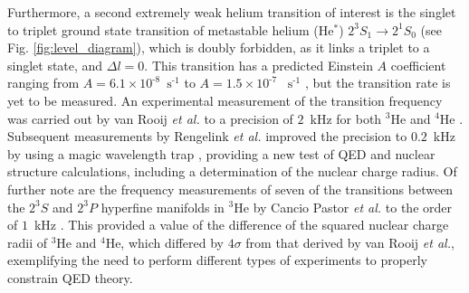 \documentclass[%
 reprint,
 amsmath,amssymb,
 aps,
 prl,
]{revtex4-2}
\newcommand{\UpperState}{3^{3\!}S_1}%
\newcommand{\MetastableState}{2^{3\!}S_1}%
\newcommand{\WimState}{2^{1\!}S_0}%
\begin{document}
Furthermore, a second extremely weak helium transition of interest is the singlet to triplet ground state transition of metastable helium (He\(^*\)) \(\MetastableState \rightarrow \WimState\)  (see Fig. \ref{fig:level_diagram}), which is doubly forbidden, as it links a triplet to a singlet state, and \(\Delta l = 0\). This transition has a predicted Einstein \(A\) coefficient ranging from $A=6.1\times10^{\text{-}8}$~$\text{s}^{\text{-}1}$ \cite{ISI:000071951300016} to $A=1.5\times10^{\text{-}7}$~ $\text{s}^{\text{-}1}$ \cite{PhysRevA.15.154}, but the transition rate is yet to be measured. 
An experimental measurement of the transition frequency was carried out by van Rooij \textit{et al.} to a precision of \(2\)~kHz for both $^3$He and $^4$He \cite{vanRooij196}. Subsequent measurements by Rengelink \textit{et al.} improved the precision to \(0.2\)~kHz by using a magic wavelength trap \cite{Rengelink2018}, providing a new test of QED and nuclear structure calculations, including a determination of the nuclear charge radius. Of further note are the frequency measurements of seven of the transitions between the \(2^{3\!}S\) and \(2^{3\!}P\) hyperfine manifolds in \(^3\)He by Cancio Pastor \textit{et al.} to the order of \(1\)~kHz \cite{PhysRevLett.108.143001}. This provided a value of the difference of the squared nuclear charge radii of \(^3\)He and $^4$He, which differed by \(4\sigma\) from that derived by van Rooij \textit{et al.}, exemplifying the need to perform different types of experiments to properly constrain QED theory.

%
%



\end{document}
